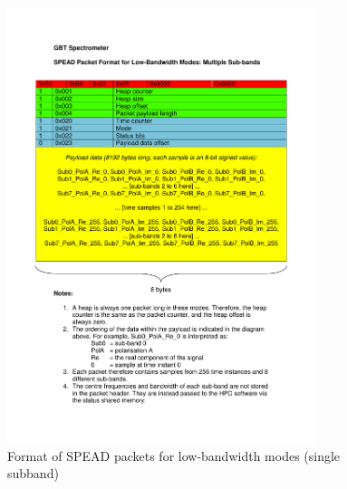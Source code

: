 \documentclass[11pt]{article} %
\begin{document}
\begin{figure}[!ht]
\centering
\includegraphics*[width=9cm, viewport = 100 295 500 705, page=2]{figures/spead_format_low_bandwidth.pdf}
\caption{Format of SPEAD packets for low-bandwidth modes (single subband)}
\label{spead-lbw-single}
\end{figure}
\end{document}
